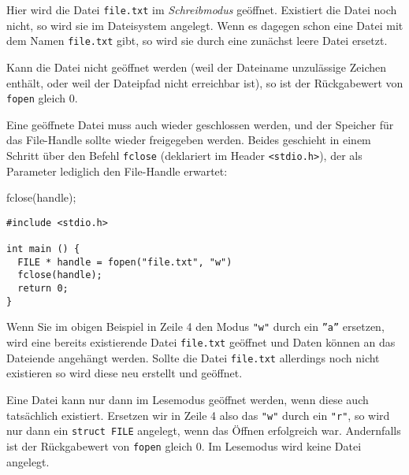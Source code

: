 Hier wird die Datei \texttt{file.txt} im \emph{Schreibmodus} geöffnet. Existiert die Datei noch nicht, so wird sie im Dateisystem angelegt. Wenn es dagegen schon eine Datei mit dem Namen \texttt{file.txt} gibt, so wird sie durch eine zunächst leere Datei ersetzt.

Kann die Datei nicht geöffnet werden (\eg weil der Dateiname unzulässige Zeichen enthält, oder weil der Dateipfad nicht erreichbar ist), so ist der Rückgabewert von \texttt{fopen} gleich 0.

Eine geöffnete Datei muss auch wieder geschlossen werden, und der Speicher für das File-Handle sollte wieder freigegeben werden. Beides geschieht in einem Schritt über den Befehl \texttt{fclose} (deklariert im Header \texttt{<stdio.h>}), der als Parameter lediglich den File-Handle erwartet:

\begin{codebox}
fclose(handle);
\end{codebox}

\begin{codebox}
\begin{verbatim}
#include <stdio.h>

int main () {
  FILE * handle = fopen("file.txt", "w")
  fclose(handle);
  return 0;
}
\end{verbatim}
\end{codebox}

Wenn Sie im obigen Beispiel in Zeile 4 den Modus \texttt{"w"} durch ein \texttt{''a''} ersetzen, wird eine bereits existierende Datei \texttt{file.txt} geöffnet und Daten können an das Dateiende angehängt werden. Sollte die Datei \texttt{file.txt} allerdings noch nicht existieren so wird diese neu erstellt und geöffnet.

Eine Datei kann nur dann im Lesemodus geöffnet werden, wenn diese auch tatsächlich existiert. Ersetzen wir in Zeile 4 also das \texttt{"w"} durch ein \texttt{"r"}, so wird nur dann ein
\texttt{struct FILE} angelegt, wenn das Öffnen erfolgreich war. Andernfalls ist der Rückgabewert von \texttt{fopen} gleich 0. Im Lesemodus wird keine Datei angelegt.

